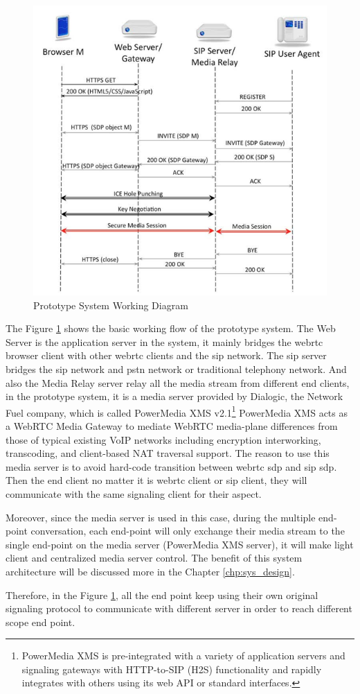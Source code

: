 \begin{figure}
	\centering
    	\includegraphics[width=0.60\textheight,natwidth=610,natheight=642]{figs/system_work_flow.png}
  	\caption{Prototype System Working Diagram \cite{inbook:sys_work_diagram}}
  	\label{fig:sys_work_diagram}
\end{figure}

\par The Figure \ref{fig:sys_work_diagram} shows the basic working flow of the prototype system. The Web Server is the application server in the system, it mainly bridges the \gls{webrtc} browser client with other \gls{webrtc} clients and the \gls{sip} network. The \gls{sip} server bridges the \gls{sip} network and \gls{pstn} network or traditional telephony network. And also the Media Relay server relay all the media stream from different end clients, in the prototype system, it is a media server provided by Dialogic, the Network Fuel company, which is called PowerMedia XMS v2.1\footnote{PowerMedia XMS is pre-integrated with a variety of application servers and signaling gateways with HTTP-to-SIP (H2S) functionality and rapidly integrates with others using its web API or standard interfaces.} PowerMedia XMS acts as a WebRTC Media Gateway to mediate WebRTC media-plane differences from those of typical existing VoIP networks including encryption interworking, transcoding, and client-based NAT traversal support. The reason to use this media server is to avoid hard-code transition between \gls{webrtc} \gls{sdp} and \gls{sip} \gls{sdp}. Then the end client no matter it is \gls{webrtc} client or \gls{sip} client, they will communicate with the same signaling client for their aspect.
\par Moreover, since the media server is used in this case, during the multiple end-point conversation, each end-point will only exchange their media stream to the single end-point on the media server (PowerMedia XMS server), it will make light client and centralized media server control. The benefit of this system architecture will be discussed more in the Chapter \ref{chp:sys_design}.

\par Therefore, in the Figure \ref{fig:sys_work_diagram}, all the end point keep using their own original signaling protocol to communicate with different server in order to reach different scope end point.